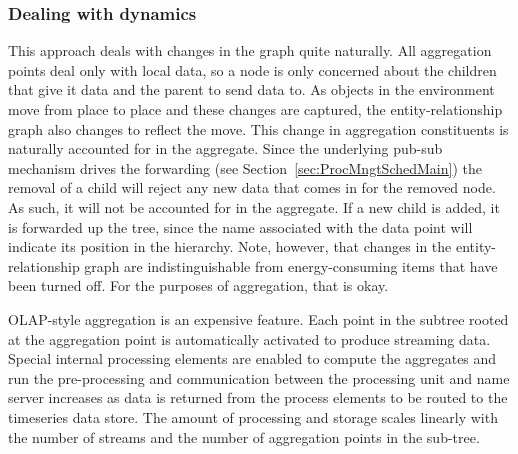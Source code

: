 



\subsubsection{Dealing with dynamics}
\label{sec:dynagg}

This approach deals with changes in the graph quite naturally.  All aggregation points deal only with local data, so
a node is only concerned about the children that give it data and the parent to send data to.  As objects in the environment
move from place to place and these changes are captured, the entity-relationship graph also changes to reflect the move.
This change in aggregation constituents is naturally accounted for in the aggregate.  Since the underlying pub-sub mechanism
drives the forwarding (see Section~\ref{sec:ProcMngtSchedMain}) the removal of a child will reject any new data that comes 
in for the removed node.  As such, it will
not be accounted for in the aggregate.  If a new child is added, it is forwarded up the tree, since the name associated
with the data point will indicate its position in the hierarchy.
Note, however, that changes in the entity-relationship graph are indistinguishable from energy-consuming items that have
been turned off.  For the purposes of aggregation, that is okay.

OLAP-style aggregation is an expensive feature.  Each point in the subtree rooted at the aggregation point is automatically
activated to produce streaming data.  Special internal processing elements are enabled to compute the aggregates and run
the pre-processing and communication between the processing unit and name server increases as data is returned from the 
process elements to be routed to the timeseries data store.  The amount of processing and storage scales linearly with the 
number of streams and the number of aggregation points in the sub-tree.




